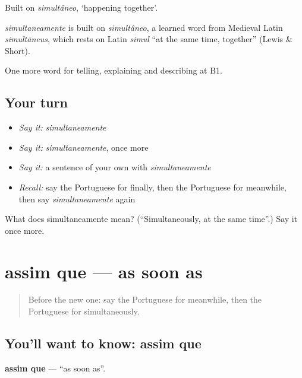 Built on \emph{simultâneo}, ‘happening together’.

\begin{cousinweb}
\emph{simultaneamente} is built on \emph{simultâneo}, a learned word from Medieval Latin \emph{simultāneus}, which rests on Latin \emph{simul} \textquotedblleft{}at the same time, together\textquotedblright{} (Lewis \& Short).
\end{cousinweb}

\begin{grammarlens}[title={What you've built}]
One more word for telling, explaining and describing at B1.
\end{grammarlens}

\subsection*{Your turn}
\begin{itemize}
\raggedright
  \item \emph{Say it:} \emph{simultaneamente}
  \item \emph{Say it:} \emph{simultaneamente}, once more
  \item \emph{Say it:} a sentence of your own with \emph{simultaneamente}
  \item \emph{Recall:} say the Portuguese for finally, then the Portuguese for meanwhile, then say \emph{simultaneamente} again
\end{itemize}

\begin{tcolorbox}[breakable,colback=teal!4,colframe=teal!35!black,title={Before you move on}]
What does simultaneamente mean? (\textquotedblleft{}Simultaneously, at the same time\textquotedblright{}.) Say it once more.
\end{tcolorbox}
\section[assim que]{assim que — as soon as}

\label{lesson:PT-C270-assim-que}



\begin{quote}
Before the new one: say the Portuguese for meanwhile, then the Portuguese for simultaneously.
\end{quote}

\subsection*{You'll want to know: assim que}
\textbf{assim que} — \textquotedblleft{}as soon as\textquotedblright{}.

